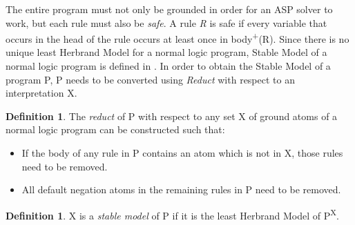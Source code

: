 \documentclass[11pt,twoside]{report}
\theoremstyle{plain}
\theoremstyle{definition}
\newtheorem{defn}[thm]{Definition} %
\begin{document}
The entire program must not only be grounded in order for an ASP solver to work, but each rule must also be \textit{safe}. 
A rule \textit{R} is safe if every variable that occurs in the head of the rule occurs at least once in body\textsuperscript{+}(R).
Since there is no unique least Herbrand Model for a normal logic program, Stable Model of a normal logic program is defined in \cite{Gelfond1988}. 
In order to obtain the Stable Model of a program P, P needs to be converted using \textit{Reduct} with respect to an interpretation X.

\begin{defn}
The \textit{reduct} of P with respect to any set X of ground atoms of a normal logic program can be constructed such that:
\begin{itemize}
\item If the body of any rule in P contains an atom which is not in X, those rules need to be removed.
\item All default negation atoms in the remaining rules in P need to be removed.
\end{itemize}
\end{defn}

\begin{defn}
X is a \textit{stable model} of P if it is the least Herbrand Model of P\textsuperscript{X}.
\end{defn}
\end{document}
